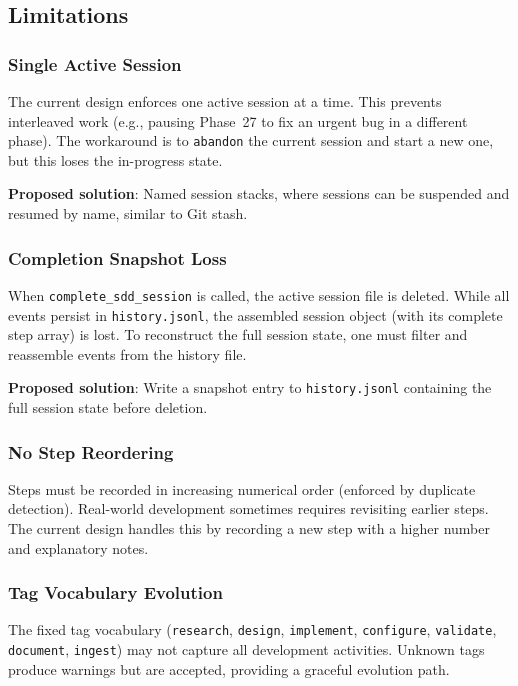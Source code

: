 \documentclass[11pt,letterpaper]{article}
\begin{document}
\subsection{Limitations}

\subsubsection{Single Active Session}

The current design enforces one active session at a time.  This prevents
interleaved work (e.g., pausing Phase~27 to fix an urgent bug in a
different phase).  The workaround is to \texttt{abandon} the current
session and start a new one, but this loses the in-progress state.

\textbf{Proposed solution}: Named session stacks, where sessions can be
suspended and resumed by name, similar to Git stash.

\subsubsection{Completion Snapshot Loss}

When \texttt{complete\_sdd\_session} is called, the active session file
is deleted.  While all events persist in \texttt{history.jsonl}, the
assembled session object (with its complete step array) is lost.  To
reconstruct the full session state, one must filter and reassemble events
from the history file.

\textbf{Proposed solution}: Write a snapshot entry to
\texttt{history.jsonl} containing the full session state before deletion.

\subsubsection{No Step Reordering}

Steps must be recorded in increasing numerical order (enforced by
duplicate detection).  Real-world development sometimes requires
revisiting earlier steps.  The current design handles this by recording
a new step with a higher number and explanatory notes.

\subsubsection{Tag Vocabulary Evolution}

The fixed tag vocabulary (\texttt{research}, \texttt{design},
\texttt{implement}, \texttt{configure}, \texttt{validate},
\texttt{document}, \texttt{ingest}) may not capture all development
activities.  Unknown tags produce warnings but are accepted, providing
a graceful evolution path.
\end{document}
